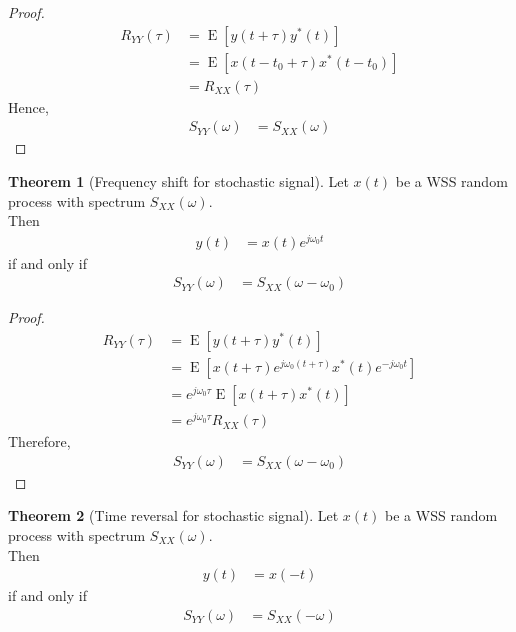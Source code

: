 \documentclass[titlepage, fleqn, a4paper, 12pt, twoside]{article}
\theoremstyle{definition}
\theoremstyle{theorem}
\newtheorem{theorem}{Theorem}
\DeclareMathOperator{\expct}{\mathrm{E}}
\begin{document}
\begin{proof}
	\begin{align*}
		R_{Y Y}(\tau) &= \expct\left[ y(t + \tau) y^*(t) \right]\\
		&= \expct\left[ x(t - t_0 + \tau) x^*(t - t_0) \right]\\
		&= R_{X X}(\tau)
	\end{align*}
	Hence,
	\begin{align*}
		S_{Y Y}(\omega) &= S_{X X}(\omega)
	\end{align*}
\end{proof}

\begin{theorem}[Frequency shift for stochastic signal]
	Let $x(t)$ be a WSS random process with spectrum $S_{X X}(\omega)$.\\
	Then
	\begin{align*}
		y(t) &= x(t) e^{j \omega_0 t}
	\end{align*}
	if and only if
	\begin{align*}
		S_{Y Y}(\omega) &= S_{X X}(\omega - \omega_0)
	\end{align*}
	\label{thm:frequency_shift_for_stochastic_signal}
\end{theorem}

\begin{proof}
	\begin{align*}
		R_{Y Y}(\tau) &= \expct\left[ y(t + \tau) y^*(t) \right]\\
		&= \expct\left[ x(t + \tau) e^{j \omega_0 (t + \tau)} x^*(t) e^{-j \omega_0 t} \right]\\
		&= e^{j \omega_0 \tau} \expct\left[ x(t + \tau) x^*(t) \right]\\
		&= e^{j \omega_0 \tau} R_{X X}(\tau)
	\end{align*}
	Therefore,
	\begin{align*}
		S_{Y Y}(\omega) &= S_{X X}(\omega - \omega_0)
	\end{align*}
\end{proof}

\begin{theorem}[Time reversal for stochastic signal]
	Let $x(t)$ be a WSS random process with spectrum $S_{X X}(\omega)$.\\
	Then
	\begin{align*}
		y(t) &= x(-t)
	\end{align*}
	if and only if
	\begin{align*}
		S_{Y Y}(\omega) &= S_{X X}(-\omega)
	\end{align*}
	\label{thm:time_reversal_for_stochastic_signal}
\end{theorem}
\end{document}
